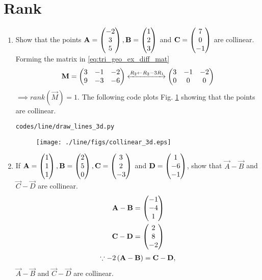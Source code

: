 \documentclass[journal,12pt,twocolumn]{IEEEtran}
\renewcommand\thesection{\arabic{section}}
\begin{document}
\section{Rank}
\renewcommand{\theequation}{\theenumi}
\begin{enumerate}[label=\thesection.\arabic*.,ref=\thesection.\theenumi]
\item Show that the points 
\label{prob:line_coll_3d}
$
\mathbf{A}=\begin{pmatrix}-2\\3\\5\end{pmatrix}, 
\mathbf{B}=\begin{pmatrix}1\\2\\3\end{pmatrix}$ 
and 
$ \mathbf{C}=\begin{pmatrix}7\\0\\-1\end{pmatrix}$ 
are collinear.
%
\\
\solution Forming the matrix in \eqref{eq:tri_geo_ex_diff_mat}
%
\begin{align}
\mathbf{M} = \begin{pmatrix}
3 & -1 & -2
\\
9 & -3 & -6
\end{pmatrix}
\xleftrightarrow {R_2\leftarrow R_2-3R_1}
\begin{pmatrix}
3 & -1 & -2
\\
0 & 0 & 0
\end{pmatrix}
\end{align}
%
$\implies rank(\vec{M}) = 1$.
%
The following code plots Fig. \ref{fig:collinear_3d} showing that the points are collinear.
%
\begin{lstlisting}
codes/line/draw_lines_3d.py
\end{lstlisting}
%
\begin{figure}[!ht]
\texttt{[image: ./line/figs/collinear\_3d.eps]}
\caption{}
\label{fig:collinear_3d}
\end{figure}
%
\item If 
$\mathbf{A}=\begin{pmatrix}1\\1\\1\end{pmatrix}, \mathbf{B}=\begin{pmatrix}2\\5\\0\end{pmatrix}, \mathbf{C}=\begin{pmatrix}3\\2\\-3\end{pmatrix}$  and $ \mathbf{D}=\begin{pmatrix}1\\-6\\-1\end{pmatrix}$,
show that  $\vec{A}-\vec{B}$ and $\vec{C}-\vec{D}$ are collinear.
%
\\
\solution 
%
\begin{align}
\mathbf{A}-\mathbf{B} &= \begin{pmatrix}-1\\-4\\1\end{pmatrix}
\\
\mathbf{C}-\mathbf{D} &= \begin{pmatrix}2\\8\\-2\end{pmatrix}
\end{align}
%
%
\begin{align}
\because -2\left(\mathbf{A}-\mathbf{B}\right) =  \mathbf{C}-\mathbf{D},
\end{align}
%
$\vec{A}-\vec{B}$ and $\vec{C}-\vec{D}$ are collinear.


\end{enumerate}
\end{document}
